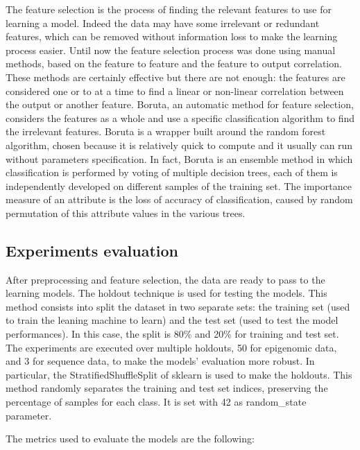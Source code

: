 The feature selection is the process of finding the relevant features to
use for learning a model. Indeed the data may have some irrelevant or
redundant features, which can be removed without information loss to
make the learning process easier. Until now the feature selection
process was done using manual methods, based on the feature to feature
and the feature to output correlation. These methods are certainly
effective but there are not enough: the features are considered one or
to at a time to find a linear or non-linear correlation between the
output or another feature. Boruta, an automatic method for feature
selection, considers the features as a whole and use a specific
classification algorithm to find the irrelevant features. Boruta is a
wrapper built around the random forest algorithm, chosen because it is
relatively quick to compute and it usually can run without parameters
specification. In fact, Boruta is an ensemble method in which
classification is performed by voting of multiple decision trees, each
of them is independently developed on different samples of the training
set. The importance measure of an attribute is the loss of accuracy of
classification, caused by random permutation of this attribute values in
the various trees.

\subsection{Experiments evaluation}

After preprocessing and feature selection, the data are ready to pass to
the learning models. The holdout technique is used for testing the
models. This method consists into split the dataset in two separate
sets: the training set (used to train the leaning machine to learn) and
the test set (used to test the model performances). In this case, the
split is 80\% and 20\% for training and test set. The experiments are
executed over multiple holdouts, 50 for epigenomic data, and 3 for
sequence data, to make the models' evaluation more robust. In
particular, the StratifiedShuffleSplit of sklearn is used to make the
holdouts. This method randomly separates the training and test set
indices, preserving the percentage of samples for each class. It is set
with 42 as random\_state parameter.

The metrics used to evaluate the models are the following:

